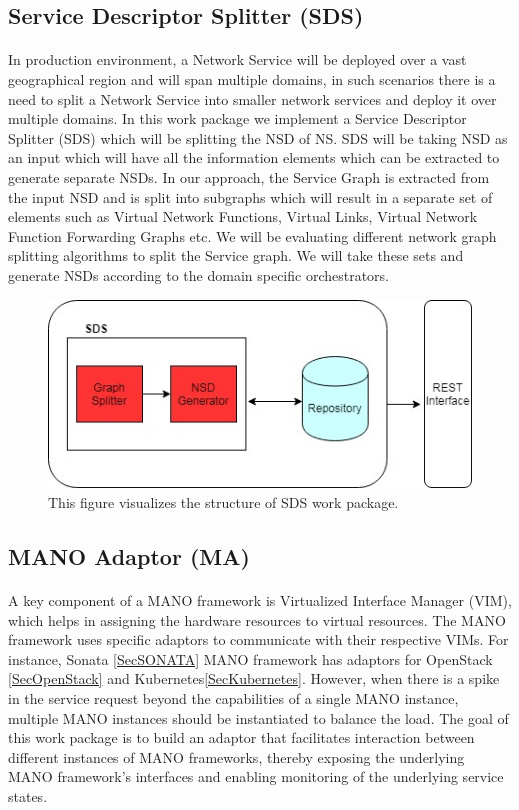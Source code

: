 \subsection{Service Descriptor Splitter (SDS)}
\paragraph{}

In production environment, a Network Service will be deployed over a vast geographical region and will span multiple domains, in such scenarios there is a need to split a Network Service into smaller network services and deploy it over multiple domains. In this work package we implement a Service Descriptor Splitter (SDS) which will be splitting the NSD of NS. SDS will be taking NSD as an input which will have all the information elements which can be extracted to generate separate NSDs. In our approach, the Service Graph is extracted from the input NSD and is split into subgraphs which will result in a separate set of elements such as Virtual Network Functions, Virtual Links, Virtual Network Function Forwarding Graphs etc. We will be evaluating different network graph splitting algorithms to split the Service graph. We will take these sets and generate NSDs according to the domain specific orchestrators.

\begin{figure}[h]
	\centering
	\includegraphics[width=0.7\linewidth]{figures/Splitter_Diagram}
	\caption{This figure visualizes the structure of SDS work package.}
	\label{fig:splitter_Diagram}
\end{figure}

\subsection{MANO Adaptor (MA)}
\paragraph{}

A key component of a MANO framework is Virtualized Interface Manager (VIM),  which helps in assigning the hardware resources to virtual resources. The MANO framework uses specific adaptors to communicate with their respective VIMs. For instance, Sonata \ref{SecSONATA} MANO framework has adaptors for OpenStack \ref{SecOpenStack} and Kubernetes\ref{SecKubernetes}. However, when there is a spike in the service request beyond the capabilities of a single MANO instance, multiple MANO instances should be instantiated to balance the load. The goal of this work package is to build an adaptor that facilitates interaction between different instances of MANO frameworks, thereby exposing the underlying MANO framework's interfaces and enabling monitoring of the underlying service states.


